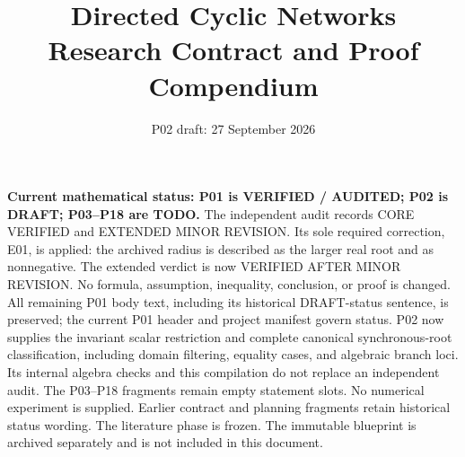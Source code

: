 \documentclass[11pt]{article}
\title{Directed Cyclic Networks\\Research Contract and Proof Compendium}
\author{}
\date{P02 draft: 27 September 2026}
\begin{document}
\maketitle
\noindent\textbf{Current mathematical status: P01 is VERIFIED / AUDITED;
P02 is DRAFT; P03--P18 are TODO.} The independent audit
 records CORE VERIFIED
and EXTENDED MINOR REVISION. Its sole required correction, E01, is applied:
the archived radius is described as the larger real root and as nonnegative.
The extended verdict is now VERIFIED AFTER MINOR REVISION. No formula,
assumption, inequality, conclusion, or proof is changed. All remaining P01
body text, including its historical DRAFT-status sentence, is preserved;
the current P01 header and project manifest govern status. P02 now supplies
the invariant scalar restriction and complete canonical synchronous-root
classification, including domain filtering, equality cases, and algebraic
branch loci. Its internal algebra checks and this compilation do not replace
an independent audit. The P03--P18 fragments remain empty statement slots.
No numerical experiment is supplied.
Earlier contract and planning fragments retain historical status wording.
The literature phase is frozen. The immutable blueprint is archived
separately and is not included in this document.
\tableofcontents
\clearpage




\clearpage

\clearpage

\clearpage

\clearpage

\clearpage

\clearpage

\clearpage

\clearpage

\clearpage

\clearpage

\clearpage

\clearpage

\clearpage

\clearpage

\clearpage

\clearpage

\clearpage

\clearpage

\clearpage
\appendix




\end{document}

